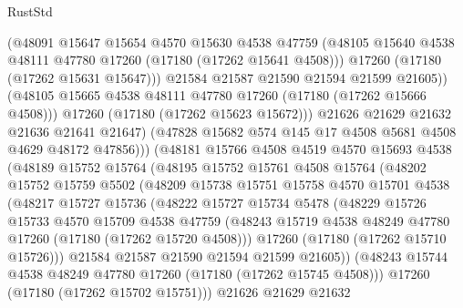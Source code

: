 \begin{lexlean}{RustStd}
\begin{coremodule}
                      (@48091
                        @15647
                        @15654
                        @4570
                        @15630
                        @4538
                        @47759
                        (@48105 @15640 @4538 @48111 @47780 @17260 (@17180 (@17262 @15641 @4508)))
                        @17260
                        (@17180 (@17262 @15631 @15647)))
                      @21584
                      @21587
                      @21590
                      @21594
                      @21599
                      @21605))
                  (@48105 @15665 @4538 @48111 @47780 @17260 (@17180 (@17262 @15666 @4508)))
                  @17260
                  (@17180 (@17262 @15623 @15672)))
                @21626
                @21629
                @21632
                @21636
                @21641
                @21647)
              (@47828 @15682 @574 @145 @17 @4508 @5681 @4508 @4629 @48172 @47856)))
          (@48181
            @15766
            @4508
            @4519
            @4570
            @15693
            @4538
            (@48189
              @15752
              @15764
              (@48195
                @15752
                @15761
                @4508
                @15764
                (@48202
                  @15752
                  @15759
                  @5502
                  (@48209
                    @15738
                    @15751
                    @15758
                    @4570
                    @15701
                    @4538
                    (@48217
                      @15727
                      @15736
                      (@48222
                        @15727
                        @15734
                        @5478
                        (@48229
                          @15726
                          @15733
                          @4570
                          @15709
                          @4538
                          @47759
                          (@48243 @15719 @4538 @48249 @47780 @17260 (@17180 (@17262 @15720 @4508)))
                          @17260
                          (@17180 (@17262 @15710 @15726)))
                        @21584
                        @21587
                        @21590
                        @21594
                        @21599
                        @21605))
                    (@48243 @15744 @4538 @48249 @47780 @17260 (@17180 (@17262 @15745 @4508)))
                    @17260
                    (@17180 (@17262 @15702 @15751)))
                  @21626
                  @21629
                  @21632

\end{coremodule}
\end{lexlean}
